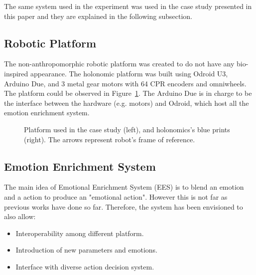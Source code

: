 The same system used in the experiment was used in the case study presented in this paper and they are explained in the following subsection. 

\subsection{Robotic Platform}

The non-anthropomorphic robotic platform was created to do not have any bio-inspired appearance. The holonomic platform was built using Odroid U3, Arduino Due, and 3 metal gear motors with 64 CPR encoders and omniwheels. The platform could be observed in Figure~\ref{fig:Robot}. The Arduino Due is in charge to be the interface between the hardware (e.g. motors) and Odroid, which host all the emotion enrichment system.

\begin{figure}[t]
\centering%
\hspace{2mm}
\caption{Platform used in the case study (left), and holonomics's blue prints (right). The arrows represent robot's frame of reference.
\label{fig:Robot}}
\end{figure}

\subsection{Emotion Enrichment System}

The main idea of Emotional Enrichment System (EES) is to blend an emotion and a action to produce an "emotional action". However this is not far as previous works have done so far. Therefore, the system has been envisioned to also allow:

\begin{itemize}
	\item Interoperability among different platform.
	\item Introduction of new parameters and emotions.
	\item Interface with diverse action decision system.
\end{itemize}

